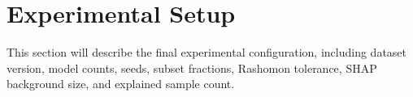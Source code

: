 \section{Experimental Setup}

This section will describe the final experimental configuration, including dataset version, model counts, seeds, subset fractions, Rashomon tolerance, SHAP background size, and explained sample count.

